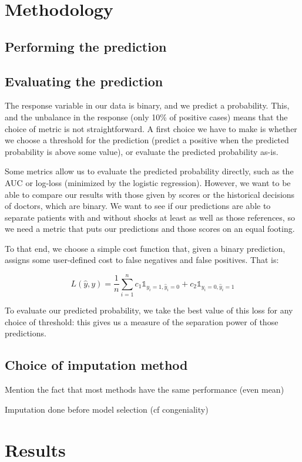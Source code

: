 	\section{Methodology}
		\subsection{Performing the prediction}

		\subsection{Evaluating the prediction}
The response variable in our data is binary, and we predict a probability. This, and the unbalance in the response (only 10\% of positive cases) means that the choice of metric is not straightforward. A first choice we have to make is whether we choose a threshold for the prediction (predict a positive when the predicted probability is above some value), or evaluate the predicted probability as-is.

Some metrics allow us to evaluate the predicted probability directly, such as the AUC \cite{huang2005AUC} or log-loss (minimized by the logistic regression). However, we want to be able to compare our results with those given by scores or the historical decisions of doctors, which are binary. We want to see if our predictions are able to separate patients with and without shocks at least as well as those references, so we need a metric that puts our predictions and those scores on an equal footing.

To that end, we choose a simple cost function that, given a binary prediction, assigns some user-defined cost to false negatives and false positives. That is:

$$ L(\hat{y}, y)=\frac{1}{n} \sum \limits_{i=1}^n c_1 \mathbb{1}_{y_i=1,\hat{y}_i=0} + c_2 \mathbb{1}_{y_i=0,\hat{y}_i=1}$$

To evaluate our predicted probability, we take the best value of this loss for any choice of threshold: this gives us a measure of the separation power of those predictions.

		\subsection{Choice of imputation method}
		Mention the fact that most methods have the same performance (even mean)
		
		Imputation done before model selection (cf congeniality)
	\section{Results}
	\label{results}
